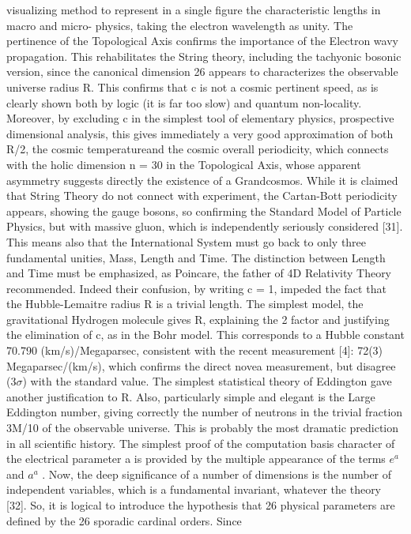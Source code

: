\documentclass[twoside,draft]{article}
\begin{document}
\begin{sloppypar}
{visualizing method to represent in a single figure the characteristic lengths in macro and micro-
physics, taking the electron wavelength as unity. The pertinence of the Topological Axis confirms
the importance of the Electron wavy propagation. This rehabilitates the String theory, including the
tachyonic bosonic version, since the canonical dimension 26 appears to characterizes the observable
universe radius R. This confirms that c is not a cosmic pertinent speed, as is clearly shown both by
logic (it is far too slow) and quantum non-locality.
Moreover, by excluding c in the simplest tool of elementary physics, prospective dimensional
analysis, this gives immediately a very good approximation of both R/2, the cosmic temperatureand the cosmic overall periodicity, which connects with the holic dimension n = 30 in the
Topological Axis, whose apparent asymmetry suggests directly the existence of a Grandcosmos.
While it is claimed that String Theory do not connect with experiment, the Cartan-Bott periodicity
appears, showing the gauge bosons, so confirming the Standard Model of Particle Physics, but with
massive gluon, which is independently seriously considered [31].
This means also that the International System must go back to only three fundamental unities,
Mass, Length and Time. The distinction between Length and Time must be emphasized, as
Poincare, the father of 4D Relativity Theory recommended. Indeed their confusion, by writing c =
1, impeded the fact that the Hubble-Lemaitre radius R is a trivial length.
The simplest model, the gravitational Hydrogen molecule gives R, explaining the 2 factor and
justifying the elimination of c, as in the Bohr model. This corresponds to a Hubble constant 70.790
(km/s)/Megaparsec, consistent with the recent measurement [4]: 72(3) Megaparsec/(km/s), which
confirms the direct novea measurement, but disagree (3$\sigma$) with the standard value.
The simplest statistical theory of Eddington gave another justification to R. Also, particularly
simple and elegant is the Large Eddington number, giving correctly the number of neutrons in the
trivial fraction 3M/10 of the observable universe. This is probably the most dramatic prediction in
all scientific history.
The simplest proof of the computation basis character of the electrical parameter a is provided
by the multiple appearance of the terms $e^{a}$ and $a^{a}$ .
Now, the deep significance of a number of dimensions is the number of independent variables,
which is a fundamental invariant, whatever the theory [32]. So, it is logical to introduce the
hypothesis that 26 physical parameters are defined by the 26 sporadic cardinal orders. Since
}
\end{sloppypar}
\end{document}
